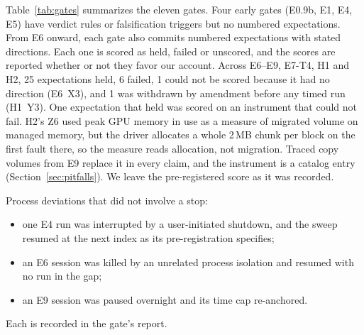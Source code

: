Table~\ref{tab:gates} summarizes the eleven gates. Four early gates (E0.9b,
E1, E4, E5) have verdict rules or falsification triggers but no numbered
expectations. From E6 onward, each gate also commits numbered
expectations with stated directions. Each one is scored as held, failed
or unscored, and the scores are reported whether or not they favor our
account. Across E6--E9, E7-T4, H1 and H2, 25 expectations held, 6 failed,
1 could not be scored because it had no direction (E6~X3), and 1 was
withdrawn by amendment before any timed run (H1~Y3).
One expectation that held was scored on an instrument that could not
fail. H2's Z6 used peak GPU memory in use as a measure of migrated volume
on managed memory, but the driver allocates a whole 2\,MB chunk per block
on the first fault there, so the measure reads allocation, not migration.
Traced copy volumes from E9 replace it in every claim, and the instrument
is a catalog entry (Section~\ref{sec:pitfalls}). We leave the pre-registered
score as it was recorded.

Process deviations that did not involve a stop:
\begin{itemize}
\item one E4 run was interrupted by a user-initiated shutdown, and the
  sweep resumed at the next index as its pre-registration specifies;
\item an E6 session was killed by an unrelated process isolation and
  resumed with no run in the gap;
\item an E9 session was paused overnight and its time cap re-anchored.
\end{itemize}
Each is recorded in the gate's report.

